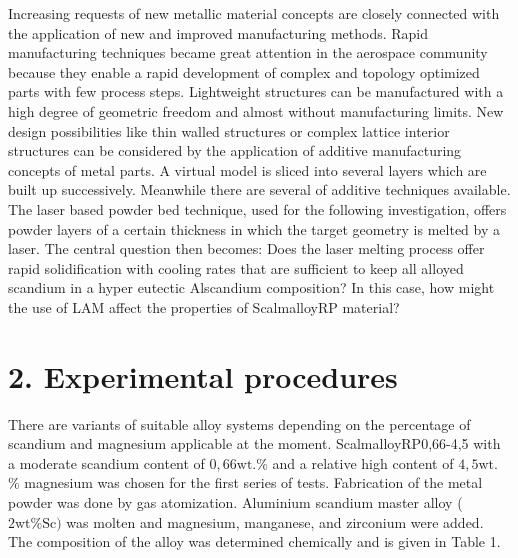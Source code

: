 \documentclass[10pt]{article}
\begin{document}
Increasing requests of new metallic material concepts are closely connected with the application of new and improved manufacturing methods. Rapid manufacturing techniques became great attention in the aerospace community because they enable a rapid development of complex and topology optimized parts with few process steps. Lightweight structures can be manufactured with a high degree of geometric freedom and almost without manufacturing limits. New design possibilities like thin walled structures or complex lattice interior structures can be considered by the application of additive manufacturing concepts of metal parts. A virtual model is sliced into several layers which are built up successively. Meanwhile there are several of additive techniques available. The laser based powder bed technique, used for the following investigation, offers powder layers of a certain thickness in which the target geometry is melted by a laser. The central question then becomes: Does the laser melting process offer rapid solidification with cooling rates that are sufficient to keep all alloyed scandium in a hyper eutectic Alscandium composition? In this case, how might the use of LAM affect the properties of ScalmalloyRP material?

\section*{2. Experimental procedures}
There are variants of suitable alloy systems depending on the percentage of scandium and magnesium applicable at the moment. ScalmalloyRP0,66-4,5 with a moderate scandium content of $0,66 \mathrm{wt} . \%$ and a relative high content of $4,5 \mathrm{wt}$. \% magnesium was chosen for the first series of tests. Fabrication of the metal powder was done by gas atomization. Aluminium scandium master alloy ( $2 \mathrm{wt} \% \mathrm{Sc})$ was molten and magnesium, manganese, and zirconium were added. The composition of the alloy was determined chemically and is given in Table 1.
\end{document}
